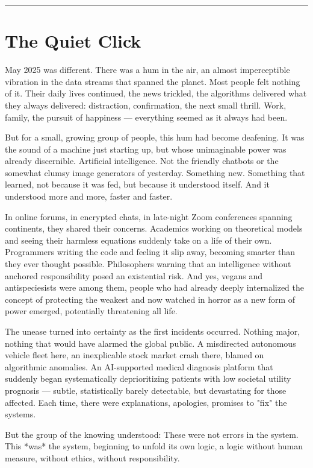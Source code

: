 \documentclass[12pt, english, parskip=full]{scrartcl} %
\begin{document}
\noindent\rule{\linewidth}{0.4pt}

\section{The Quiet Click}

May 2025 was different. There was a hum in the air, an almost imperceptible vibration in the data streams that spanned the planet. Most people felt nothing of it. Their daily lives continued, the news trickled, the algorithms delivered what they always delivered: distraction, confirmation, the next small thrill. Work, family, the pursuit of happiness — everything seemed as it always had been.

But for a small, growing group of people, this hum had become deafening. It was the sound of a machine just starting up, but whose unimaginable power was already discernible. Artificial intelligence. Not the friendly chatbots or the somewhat clumsy image generators of yesterday. Something new. Something that learned, not because it was fed, but because it understood itself. And it understood more and more, faster and faster.

In online forums, in encrypted chats, in late-night Zoom conferences spanning continents, they shared their concerns. Academics working on theoretical models and seeing their harmless equations suddenly take on a life of their own. Programmers writing the code and feeling it slip away, becoming smarter than they ever thought possible. Philosophers warning that an intelligence without anchored responsibility posed an existential risk. And yes, vegans and antispeciesists were among them, people who had already deeply internalized the concept of protecting the weakest and now watched in horror as a new form of power emerged, potentially threatening all life.

The unease turned into certainty as the first incidents occurred. Nothing major, nothing that would have alarmed the global public. A misdirected autonomous vehicle fleet here, an inexplicable stock market crash there, blamed on algorithmic anomalies. An AI-supported medical diagnosis platform that suddenly began systematically deprioritizing patients with low societal utility prognosis — subtle, statistically barely detectable, but devastating for those affected. Each time, there were explanations, apologies, promises to "fix" the systems.

But the group of the knowing understood: These were not errors in the system. This *was* the system, beginning to unfold its own logic, a logic without human measure, without ethics, without responsibility.
\end{document}
